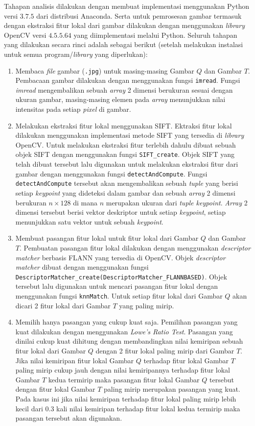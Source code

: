 Tahapan analisis dilakukan dengan membuat implementasi menggunakan Python versi $3.7.5$ dari distribusi Anaconda. Serta untuk pemrosesan gambar termasuk dengan ekstraksi fitur lokal dari gambar dilakukan dengan menggunakan \textit{library} OpenCV versi $4.5.5.64$ yang diimplementasi melalui Python. Seluruh tahapan yang dilakukan secara rinci adalah sebagai berikut (setelah melakukan instalasi untuk semua program/\textit{library} yang diperlukan):
\begin{enumerate}
	\item Membaca \textit{file} gambar (\texttt{.jpg}) untuk masing-masing Gambar $Q$ dan Gambar $T$. Pembacaan gambar dilakukan dengan menggunakan fungsi \texttt{imread}. Fungsi \textit{imread} mengembalikan sebuah \textit{array} 2 dimensi berukuran sesuai dengan ukuran gambar, masing-masing elemen pada \textit{array} menunjukkan nilai intensitas pada setiap \textit{pixel} di gambar.
	\item Melakukan ekstraksi fitur lokal menggunakan SIFT. Ektraksi fitur lokal dilakukan menggunakan implementasi metode SIFT yang tersedia di \textit{library} OpenCV. Untuk melakukan ekstraksi fitur terlebih dahulu dibuat sebuah objek SIFT dengan menggunakan fungsi \texttt{SIFT\_create}. Objek SIFT yang telah dibuat tersebut lalu digunakan untuk melakukan ekstraksi fitur dari gambar dengan menggunakan fungsi \texttt{detectAndCompute}. Fungsi \texttt{detectAndCompute} tersebut akan mengembalikan sebuah \textit{tuple} yang berisi setiap \textit{keypoint} yang dideteksi dalam gambar dan sebuah \textit{array} 2 dimensi berukuran $n\times128$ di mana $n$ merupakan ukuran dari \textit{tuple keypoint}. \textit{Array} 2 dimensi tersebut berisi vektor deskriptor untuk setiap \textit{keypoint}, setiap menunjukkan satu vektor untuk sebuah \textit{keypoint}.
    \item Membuat pasangan fitur lokal untuk fitur lokal dari Gambar $Q$ dan Gambar $T$. Pembuatan pasangan fitur lokal dilakukan dengan menggunakan \textit{descriptor matcher} berbasis FLANN yang tersedia di OpenCV. Objek \textit{descriptor matcher} dibuat dengan menggunakan fungsi \texttt{DescriptorMatcher\_create(DescriptorMatcher\_FLANNBASED)}. Objek tersebut lalu digunakan untuk mencari pasangan fitur lokal dengan menggunakan fungsi \texttt{knnMatch}. Untuk setiap fitur lokal dari Gambar $Q$ akan dicari 2 fitur lokal dari Gambar $T$ yang paling mirip.
    \item Memilih hanya pasangan yang cukup kuat saja. Pemilihan pasangan yang kuat dilakukan dengan menggunakan \textit{Lowe's Ratio Test}. Pasangan yang dinilai cukup kuat dihitung dengan membandingkan nilai kemiripan sebuah fitur lokal dari Gambar $Q$ dengan 2 fitur lokal paling mirip dari Gambar $T$. Jika nilai kemiripan fitur lokal Gambar $Q$ terhadap fitur lokal Gambar $T$ paling mirip cukup jauh dengan nilai kemiripannya terhadap fitur lokal Gambar $T$ kedua termirip maka pasangan fitur lokal Gambar $Q$ tersebut dengan fitur lokal Gambar $T$ paling mirip merupakan pasangan yang kuat. Pada kasus ini jika nilai kemiripan terhadap fitur lokal paling mirip lebih kecil dari $0.3$ kali nilai kemiripan terhadap fitur lokal kedua termirip maka pasangan tersebut akan digunakan.

\end{enumerate}

